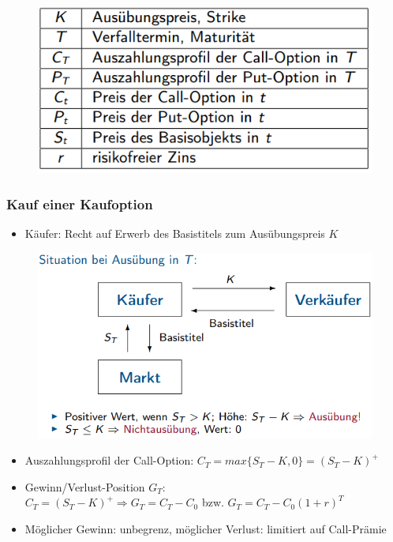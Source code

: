 \documentclass[12pt]{report}
\theoremstyle{dotless}
\theoremstyle{definition}
\begin{document}
\begin{figure}[ht]
	\centering
	\includegraphics[width=0.7 \textwidth]{Bilder/NotationOption.png}
\end{figure}


\subsubsection{Kauf einer Kaufoption}
\begin{itemize}
\item Käufer: Recht auf Erwerb des Basistitels zum Ausübungspreis $K$
\end{itemize}

\begin{figure}[ht]
	\centering
	\includegraphics[width=0.7 \textwidth]{Bilder/Kaufoption.png}
\end{figure}

\begin{itemize}
\item Auszahlungsprofil der Call-Option: $C_T = max\{S_T - K, 0\} = (S_T-K)^+$
\item Gewinn/Verlust-Position $G_T$: \\
$C_T=(S_T-K)^+ \Rightarrow G_T=C_T - C_0$ bzw. $G_T=C_T - C_0(1+r)^T$
\item Möglicher Gewinn: unbegrenz, möglicher Verlust: limitiert auf Call-Prämie
\end{itemize}
\end{document}

